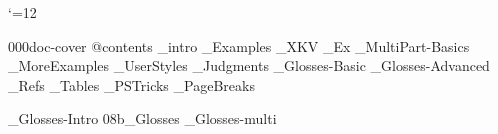 


 \catcode`\@=12







%




\get 000doc-cover
\get @contents
_intro
_Examples
_XKV
_Ex
_MultiPart-Basics
_MoreExamples
_UserStyles
_Judgments
_Glosses-Basic
_Glosses-Advanced
_Refs
_Tables
_PSTricks
_PageBreaks
 \bye

\bye
{}_Glosses-Intro
\get 08b_Glosses
_Glosses-multi


